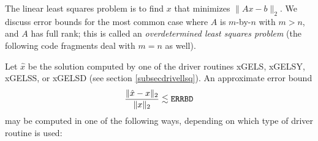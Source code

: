 The linear least squares problem is to find $x$ that minimizes
$\| Ax-b \|_2$.
We discuss error bounds for the most common case where $A$ is $m$-by-$n$
with $m > n$, and $A$ has full rank;
this is called an {\em overdetermined least squares problem}
(the following code fragments deal with $m=n$ as well).

Let $\hat{x}$ be the solution computed by one of the driver routines
xGELS, xGELSY, xGELSS, or xGELSD (see section \ref{subsecdrivellsq}).
An approximate error
bound
\[
\frac{\| \hat{x} - x \|_2}{\| x \|_2} \leapproxeq {\tt ERRBD}
\]
may be  computed in one of the following ways, depending on which type
of driver routine is used:

